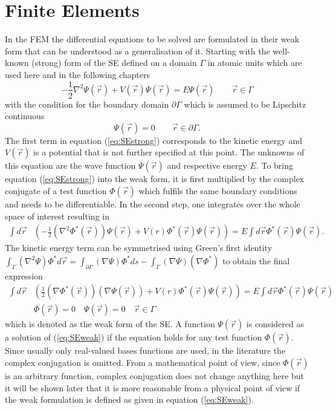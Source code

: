 \section{Finite Elements}
\label{ch:introFEM}
In the FEM the differential equations to be solved are formulated in their weak form that can be understood as a generalisation of it.
Starting with the well-known (strong) form of the SE defined on a domain $ \Gamma$ in atomic units which are used here and in the following chapters
\begin{equation} \label{eq:SEstrong}
-\frac 12 \nabla^2\Psi(\vec{r})+ V(\vec{r})\Psi(\vec{r})=E \Psi(\vec{r}) \qquad  \vec{r}\in \Gamma
\end{equation}
with the condition for the boundary domain $\partial \Gamma$ which is assumed to be Lipschitz continuous
\begin{equation}
    \Psi(\vec{r})=0  \qquad \vec{r} \in \partial \Gamma.
\end{equation}
The first term in equation (\ref{eq:SEstrong}) corresponds to the kinetic energy and $V(\vec{r})$ is a potential that is not further specified at this point.
The unknowns of this equation are the wave function $\Psi(\vec{r})$ and respective energy $E$.
To bring equation (\ref{eq:SEstrong}) into the weak form, it is first multiplied by the complex conjugate of a test function $\Phi(\vec{r})$ which fulfils the same boundary conditions and needs to be differentiable.
In the second step, one integrates over the whole space of interest resulting in
\begin{align}
\int d \vec{r} & \left( - \frac 12 \left(\nabla^2\Phi^*(\vec{r})\right)\Psi(\vec{r})
               + V(r) \Phi^*(\vec{r}) \Psi(\vec{r})\right) = E \int d \vec{r} \Phi^*(\vec{r}) \Psi(\vec{r}).
\end{align}
The kinetic energy term can be symmetrised using Green's first identity $\int_\Gamma (\nabla^2\Psi)\Phi^* d\vec{r}=\int_{\partial \Gamma} (\nabla\Psi)\Phi^* ds -\int_\Gamma (\nabla\Psi)(\nabla\Phi^*)$ to obtain the final expression
\begin{align}\label{eq:SEweak}
\int d \vec{r} & \left(  \frac 12 \left(\nabla\Phi^*(\vec{r})\right) \left(\nabla\Psi(\vec{r})\right) 
               + V(r) \Phi^*(\vec{r}) \Psi(\vec{r})\right) = E \int d \vec{r} \Phi^*(\vec{r}) \Psi(\vec{r})\\
    &\Phi(\vec{r})=0\quad
     \Psi(\vec{r})=0\quad  \vec{r}\in\Gamma
\end{align}
which is denoted as the weak form of the SE.
A function $\Psi(\vec{r})$ is considered as a solution of (\ref{eq:SEweak}) if the equation holds for any test function $\Phi(\vec{r})$.
Since usually only real-valued bases functions are used, in the literature the complex conjugation is omitted.
From a mathematical point of view, since $\Phi(\vec{r})$ is an arbitrary function, complex conjugation does not change anything here but it will be shown later that it is more reasonable from a physical point of view if the weak formulation is defined as given in equation (\ref{eq:SEweak}).

